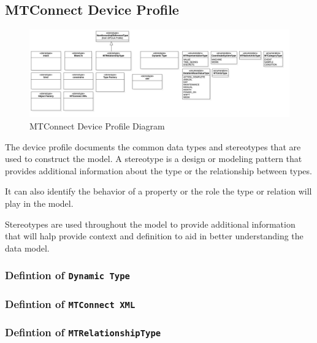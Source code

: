 \subsection{MTConnect Device Profile}

\begin{figure}
  \centering
    \includegraphics[width=1.0\textwidth]{diagrams/MTConnect Device Profile.png}
  \caption{MTConnect Device Profile Diagram}
  \label{fig:MTConnect Device Profile}
\end{figure}

\FloatBarrier


The device profile documents the common data types and stereotypes that are 
used to construct the model. A stereotype is a design or modeling pattern that 
provides additional information about the type or the relationship between types. 

It can also identify the behavior of a property or the role the type or relation
will play in the model. 

Stereotypes are used throughout the model to provide additional information that 
will halp provide context and definition to aid in better understanding the
data model.

\subsubsection{Defintion of \texttt{Dynamic Type}} \label{type:Dynamic Type}

\FloatBarrier



\subsubsection{Defintion of \texttt{MTConnect XML}} \label{type:MTConnect XML}

\FloatBarrier



\subsubsection{Defintion of \texttt{MTRelationshipType}} \label{type:MTRelationshipType}

